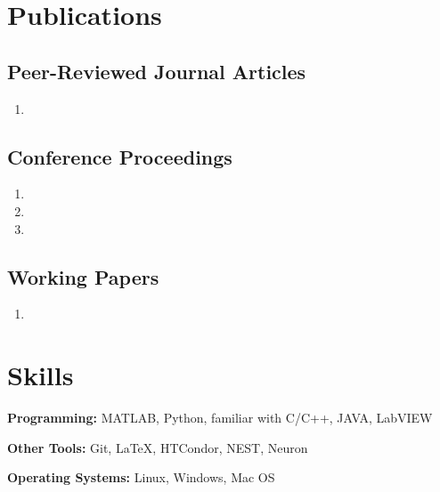 \documentclass[10pt,letterpaper]{article}
\begin{document}
\vspace{-0.25in}

\section*{Publications}
\vspace{-0.05in}


\subsection*{Peer-Reviewed Journal Articles}

\begin{enumerate}
\item {}
\end{enumerate}

\subsection*{Conference Proceedings}

\begin{enumerate}[resume]
\item {}
\item {}
\item {}
\end{enumerate}

\subsection*{Working Papers}
\begin{enumerate}[resume]
\item {}
\end{enumerate}

\vspace{-0.25in}

\section*{Skills}
\vspace{-0.05in}
\hspace{1.5em}\textbf{Programming:} MATLAB, Python, familiar with C/C++, JAVA, LabVIEW

\hspace{1.5em}\textbf{Other Tools:} Git, \LaTeX, HTCondor, NEST, Neuron

\hspace{1.5em}\textbf{Operating Systems:} Linux, Windows, Mac OS
\end{document}
